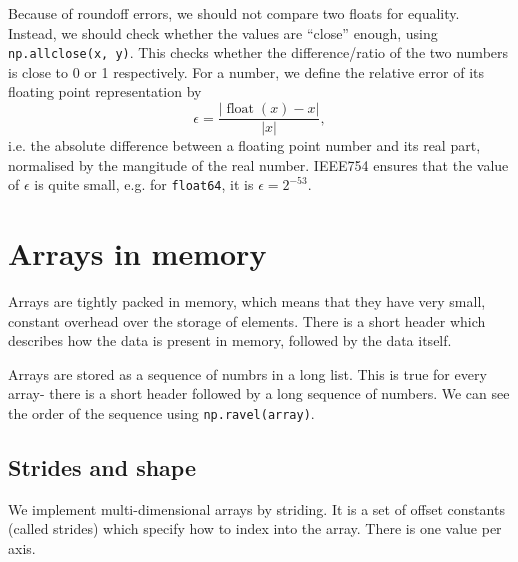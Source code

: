 \documentclass[a4paper, openany]{memoir}
\begin{document}
    Because of roundoff errors, we should not compare two floats for equality. Instead, we should check whether the values are ``close'' enough, using \texttt{np.allclose(x, y)}. This checks whether the difference/ratio of the two numbers is close to 0 or 1 respectively. For a number, we define the relative error of its floating point representation by
    \[\epsilon = \frac{|\operatorname{float}(x) - x|}{|x|},\]
    i.e. the absolute difference between a floating point number and its real part, normalised by the mangitude of the real number. IEEE754 ensures that the value of $\epsilon$ is quite small, e.g. for \texttt{float64}, it is $\epsilon = 2^{-53}$.
    \newpage

    \section{Arrays in memory}
    Arrays are tightly packed in memory, which means that they have very small, constant overhead over the storage of elements. There is a short header which describes how the data is present in memory, followed by the data itself.

    Arrays are stored as a sequence of numbrs in a long list. This is true for every array- there is a short header followed by a long sequence of numbers. We can see the order of the sequence using \texttt{np.ravel(array)}.

    \subsection{Strides and shape}
    We implement multi-dimensional arrays by striding. It is a set of offset constants (called strides) which specify how to index into the array. There is one value per axis.
\end{document}

